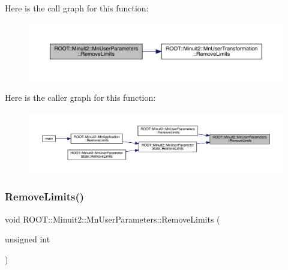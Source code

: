 Here is the call graph for this function\+:
\nopagebreak
\begin{figure}[H]
\begin{center}
\leavevmode
\includegraphics[width=350pt]{d6/d10/classROOT_1_1Minuit2_1_1MnUserParameters_a399fd2fff4e1055c0878c8ce24205544_cgraph}
\end{center}
\end{figure}
Here is the caller graph for this function\+:
\nopagebreak
\begin{figure}[H]
\begin{center}
\leavevmode
\includegraphics[width=350pt]{d6/d10/classROOT_1_1Minuit2_1_1MnUserParameters_a399fd2fff4e1055c0878c8ce24205544_icgraph}
\end{center}
\end{figure}
\mbox{\label{classROOT_1_1Minuit2_1_1MnUserParameters_a399fd2fff4e1055c0878c8ce24205544}} 
\subsubsection{\texorpdfstring{RemoveLimits()}{RemoveLimits()}\hspace{0.1cm}{\footnotesize\ttfamily [2/6]}}
{\footnotesize\ttfamily void R\+O\+O\+T\+::\+Minuit2\+::\+Mn\+User\+Parameters\+::\+Remove\+Limits (\begin{DoxyParamCaption}\item[{unsigned int}]{ }\end{DoxyParamCaption})}

\mbox{\label{classROOT_1_1Minuit2_1_1MnUserParameters_a399fd2fff4e1055c0878c8ce24205544}} 
